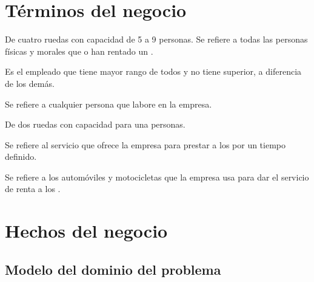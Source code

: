 \documentclass[10pt]{book}
\begin{document}
\section{Términos del negocio}
\label{sec:terminosDeNegocio}

\begin{brGlosario}[version=1.0,]
	 De cuatro ruedas con capacidad de 5 a 9 personas. 
	 Se refiere a todas las personas físicas y morales que  o han rentado un .
	
	 Es el empleado que tiene mayor rango de todos y no tiene superior, a diferencia de los demás.
	
	 Se refiere a cualquier persona que labore en la empresa.
	
	
	 De dos ruedas con capacidad para una personas. 

	 Se refiere al servicio que ofrece la empresa para prestar  a los  por un tiempo definido.
	
	 Se refiere a los automóviles y motocicletas que la empresa usa para dar el servicio de renta a los .
	
\end{brGlosario}

\section{Hechos del negocio}
\label{sec:hechosDeNegocio}


\subsection{Modelo del dominio del problema}
\end{document}
